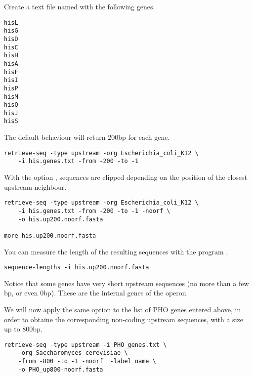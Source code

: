 Create a text file named  with the following
genes.

{\color{Blue} \begin{footnotesize}
\begin{verbatim}
hisL
hisG
hisD
hisC
hisH
hisA
hisF
hisI
hisP
hisM
hisQ
hisJ
hisS
\end{verbatim} \end{footnotesize}
}

The default behaviour will return 200bp for each gene. 

{\color{Blue} \begin{footnotesize}
\begin{verbatim}
retrieve-seq -type upstream -org Escherichia_coli_K12 \
    -i his.genes.txt -from -200 -to -1
\end{verbatim} \end{footnotesize}
}

With the option , sequences are clipped depending on
the position of the closest upstream neighbour.

{\color{Blue} \begin{footnotesize}
\begin{verbatim}
retrieve-seq -type upstream -org Escherichia_coli_K12 \
    -i his.genes.txt -from -200 -to -1 -noorf \
    -o his.up200.noorf.fasta

more his.up200.noorf.fasta
\end{verbatim} \end{footnotesize}
}

You can measure the length of the resulting sequences with the program
.

{\color{Blue} \begin{footnotesize}
\begin{verbatim}
sequence-lengths -i his.up200.noorf.fasta
\end{verbatim} \end{footnotesize}
}

Notice that some genes have very short upstream sequences (no more
than a few bp, or even 0bp). These are the internal genes of the
 operon. 


We will now apply the same option to the list of PHO genes entered
above, in order to obtaine the corresponding non-coding upstream
sequences, with a size up to 800bp.

{\color{Blue} \begin{footnotesize}
\begin{verbatim}
retrieve-seq -type upstream -i PHO_genes.txt \
    -org Saccharomyces_cerevisiae \
    -from -800 -to -1 -noorf  -label name \
    -o PHO_up800-noorf.fasta
\end{verbatim} \end{footnotesize}
} 

